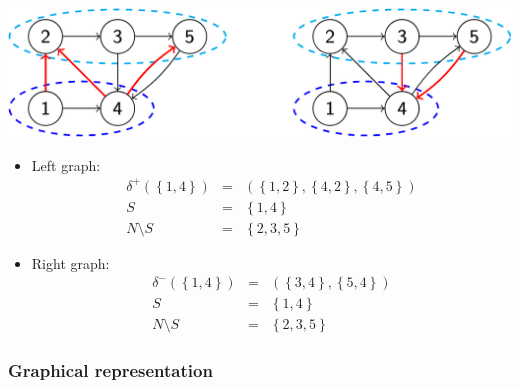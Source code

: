 \begin{examplebox}
    \begin{center}
        \includegraphics[width=.8\textwidth]{img/graphs-6.pdf}
    \end{center}

    \begin{itemize}
        \item Left graph: 
        \begin{equation*}
            \begin{array}{rcl}
                \delta^{+}\left(\left\{1,4\right\}\right) &=& \left(\left\{1,2\right\}, \left\{4,2\right\}, \left\{4,5\right\}\right) \\ [.5em]
                S &=& \left\{1,4\right\} \\ [.5em]
                N \setminus S &=& \left\{2,3,5\right\}
            \end{array}
        \end{equation*}

        \item Right graph: 
        \begin{equation*}
            \begin{array}{rcl}
                \delta^{-}\left(\left\{1,4\right\}\right) &=& \left(\left\{3,4\right\}, \left\{5,4\right\}\right) \\ [.5em]
                S &=& \left\{1,4\right\} \\ [.5em]
                N \setminus S &=& \left\{2,3,5\right\}
            \end{array}
        \end{equation*}
    \end{itemize}
\end{examplebox}

\subsubsection{Graphical representation}

